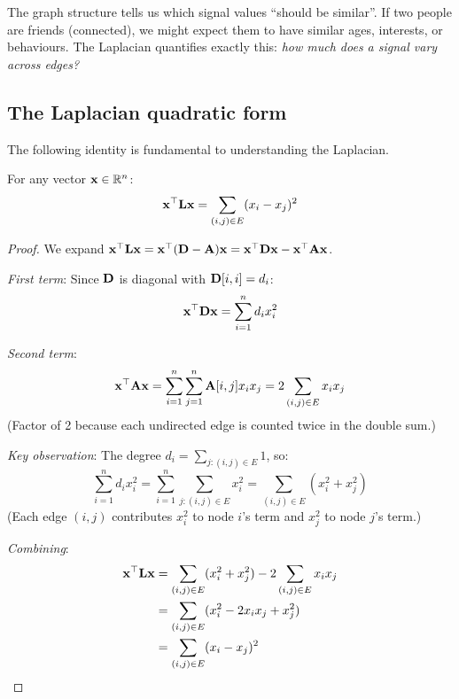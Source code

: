 \begin{notechapter}
\begin{keyidea}
The graph structure tells us which signal values ``should be similar''. If two people are friends (connected), we might expect them to have similar ages, interests, or behaviours. The Laplacian quantifies exactly this: \emph{how much does a signal vary across edges?}
\end{keyidea}

\subsection{The Laplacian quadratic form}

The following identity is fundamental to understanding the Laplacian.

\begin{theorem}\label{graph-laplacians:thm:quadratic-form}
For any vector $\mathbf{x} \in \mathbb{R}^n$:
\begin{equation}
\mathbf{x}^\top \mathbf{L} \mathbf{x} = \sum_{(i,j) \in E} (x_i - x_j)^2
\label{graph-laplacians:eq:quadratic-form}
\end{equation}
\end{theorem}

\begin{proof}
We expand $\mathbf{x}^\top \mathbf{L} \mathbf{x} = \mathbf{x}^\top (\mathbf{D} - \mathbf{A}) \mathbf{x} = \mathbf{x}^\top \mathbf{D} \mathbf{x} - \mathbf{x}^\top \mathbf{A} \mathbf{x}$.

\emph{First term}: Since $\mathbf{D}$ is diagonal with $\mathbf{D}[i,i] = d_i$:
\[
\mathbf{x}^\top \mathbf{D} \mathbf{x} = \sum_{i=1}^{n} d_i x_i^2
\]

\emph{Second term}:
\[
\mathbf{x}^\top \mathbf{A} \mathbf{x} = \sum_{i=1}^{n} \sum_{j=1}^{n} \mathbf{A}[i,j] x_i x_j = 2 \sum_{(i,j) \in E} x_i x_j
\]
(Factor of 2 because each undirected edge is counted twice in the double sum.)

\emph{Key observation}: The degree $d_i = \sum_{j: (i,j) \in E} 1$, so:
\[
\sum_{i=1}^{n} d_i x_i^2 = \sum_{i=1}^{n} \sum_{j: (i,j) \in E} x_i^2 = \sum_{(i,j) \in E} (x_i^2 + x_j^2)
\]
(Each edge $(i,j)$ contributes $x_i^2$ to node $i$'s term and $x_j^2$ to node $j$'s term.)

\emph{Combining}:
\begin{align}
\mathbf{x}^\top \mathbf{L} \mathbf{x} &= \sum_{(i,j) \in E} (x_i^2 + x_j^2) - 2\sum_{(i,j) \in E} x_i x_j \\
&= \sum_{(i,j) \in E} (x_i^2 - 2x_i x_j + x_j^2) \\
&= \sum_{(i,j) \in E} (x_i - x_j)^2 \qedhere
\end{align}
\end{proof}


\end{notechapter}
